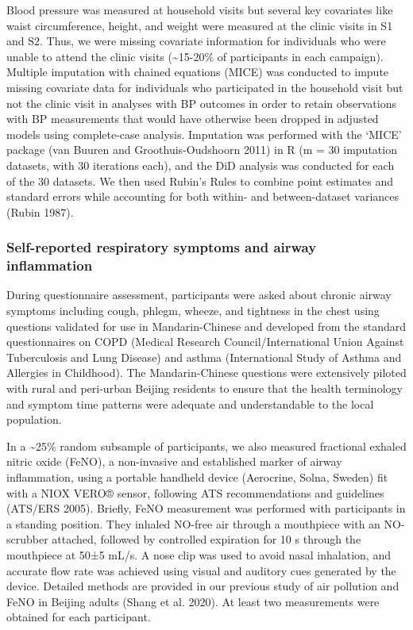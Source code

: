 \documentclass[
  letterpaper,
  DIV=11,
  numbers=noendperiod]{scrartcl}
\begin{document}
Blood pressure was measured at household visits but several key
covariates like waist circumference, height, and weight were measured at
the clinic visits in S1 and S2. Thus, we were missing covariate
information for individuals who were unable to attend the clinic visits
(\textasciitilde15-20\% of participants in each campaign). Multiple
imputation with chained equations (MICE) was conducted to impute missing
covariate data for individuals who participated in the household visit
but not the clinic visit in analyses with BP outcomes in order to retain
observations with BP measurements that would have otherwise been dropped
in adjusted models using complete-case analysis. Imputation was
performed with the `MICE' package (van Buuren and Groothuis-Oudshoorn
2011) in R (m = 30 imputation datasets, with 30 iterations each), and
the DiD analysis was conducted for each of the 30 datasets. We then used
Rubin's Rules to combine point estimates and standard errors while
accounting for both within- and between-dataset variances (Rubin 1987).

\hypertarget{self-reported-respiratory-symptoms-and-airway-inflammation}{%
\subsubsection{Self-reported respiratory symptoms and airway
inflammation}\label{self-reported-respiratory-symptoms-and-airway-inflammation}}

During questionnaire assessment, participants were asked about chronic
airway symptoms including cough, phlegm, wheeze, and tightness in the
chest using questions validated for use in Mandarin-Chinese and
developed from the standard questionnaires on COPD (Medical Research
Council/International Union Against Tuberculosis and Lung Disease) and
asthma (International Study of Asthma and Allergies in Childhood). The
Mandarin-Chinese questions were extensively piloted with rural and
peri-urban Beijing residents to ensure that the health terminology and
symptom time patterns were adequate and understandable to the local
population.

In a \textasciitilde25\% random subsample of participants, we also
measured fractional exhaled nitric oxide (FeNO), a non-invasive and
established marker of airway inflammation, using a portable handheld
device (Aerocrine, Solna, Sweden) fit with a NIOX VERO® sensor,
following ATS recommendations and guidelines (ATS/ERS 2005). Briefly,
FeNO measurement was performed with participants in a standing position.
They inhaled NO-free air through a mouthpiece with an NO-scrubber
attached, followed by controlled expiration for 10 s through the
mouthpiece at 50±5 mL/s. A nose clip was used to avoid nasal inhalation,
and accurate flow rate was achieved using visual and auditory cues
generated by the device. Detailed methods are provided in our previous
study of air pollution and FeNO in Beijing adults (Shang et al. 2020).
At least two measurements were obtained for each participant.
\end{document}
